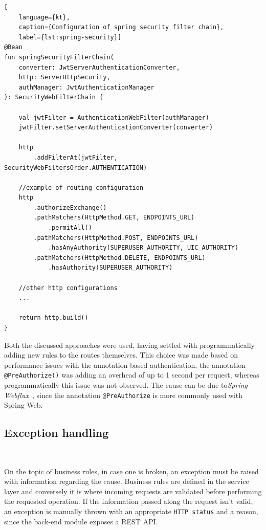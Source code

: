 \begin{lstlisting}[
    language={kt}, 
    caption={Configuration of spring security filter chain},
    label={lst:spring-security}]
@Bean
fun springSecurityFilterChain(
    converter: JwtServerAuthenticationConverter,
    http: ServerHttpSecurity,
    authManager: JwtAuthenticationManager
): SecurityWebFilterChain {

    val jwtFilter = AuthenticationWebFilter(authManager)
    jwtFilter.setServerAuthenticationConverter(converter)

    http
        .addFilterAt(jwtFilter, SecurityWebFiltersOrder.AUTHENTICATION)

    //example of routing configuration
    http
        .authorizeExchange()
        .pathMatchers(HttpMethod.GET, ENDPOINTS_URL)
            .permitAll()
        .pathMatchers(HttpMethod.POST, ENDPOINTS_URL)
            .hasAnyAuthority(SUPERUSER_AUTHORITY, UIC_AUTHORITY)
        .pathMatchers(HttpMethod.DELETE, ENDPOINTS_URL)
            .hasAuthority(SUPERUSER_AUTHORITY)
             
    //other http configurations
    ...
            
    return http.build()
}
\end{lstlisting}

Both the discussed approaches were used, having settled with programmatically adding new rules to the routes themselves. This choice was made based on performance issues with the annotation-based authentication, the annotation \lstinline{@PreAuthorize()} was adding an overhead of up to 1 second per request, whereas programmatically this issue was not observed. The cause can be due to\textit{Spring Webflux}~\cite{spring-webflux}, since the annotation \lstinline{@PreAuthorize} is more commonly used with Spring Web.


\subsection{Exception handling}~\label{ch:impl:sec:be:subsec:exceptions}

On the topic of business rules, in case one is broken, an exception must be raised with information regarding the cause. Business rules are defined in the service layer and conversely it is where incoming requests are validated before performing the requested operation. If the information passed along the request isn't valid, an exception is manually thrown with an appropriate \texttt{HTTP status} and a reason, since the back-end module exposes a REST API. 


